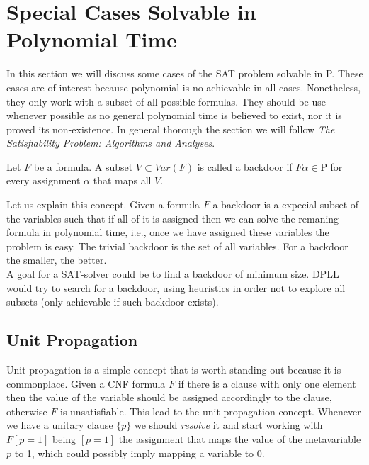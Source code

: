 
\section{Special Cases Solvable in Polynomial Time}

In this section we will discuss some cases of the SAT problem solvable in P. These cases are of interest because polynomial is no achievable in all cases. Nonetheless, they only work with a subset of all possible formulas. They should be use whenever possible as no general polynomial time is believed to exist, nor it is proved its non-existence. In general thorough the section we will follow \emph{The Satisfiability Problem: Algorithms and Analyses}\cite{schoning2013satisfiability}.

\begin{definition}
  Let $F$ be a formula. A subset $ V \subset Var(F)$ is called a backdoor if $F\alpha \in \text{P}$ for every assignment $\alpha$ that maps all $V$.
\end{definition}

Let us explain this concept. Given a formula $F$ a backdoor is a expecial subset of the variables such that if all of it is assigned then we can solve the remaning formula in polynomial time, i.e., once we have assigned these variables the problem is easy. The trivial backdoor is the set of all variables. For a backdoor the smaller, the better.\\


A goal for a SAT-solver could be to find a backdoor of minimum size. DPLL would try to search for a backdoor, using heuristics in order not to explore all subsets (only achievable if such backdoor exists).

\subsection{Unit Propagation}

Unit propagation is a simple concept that is worth standing out because it is commonplace. Given a CNF formula $F$ if there is a clause with only one element then the value of the variable should be assigned accordingly to the clause, otherwise $F$ is unsatisfiable. This lead to the unit propagation concept. Whenever we have a unitary clause $\{p\}$ we should \emph{resolve} it and start working with $F[p=1]$ being $[p=1]$ the assignment that maps the value of the metavariable $p$ to 1, which could possibly imply mapping a variable to $0$.  \\

